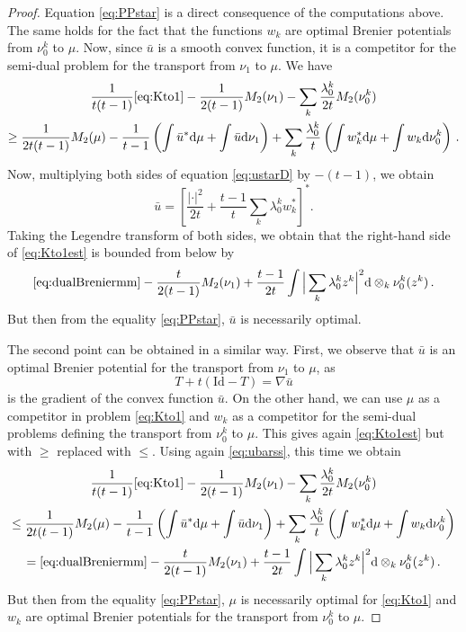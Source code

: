 \documentclass[12pt]{amsart}
\numberwithin{equation}{section}
\def\ed{\mathrm{d}}
\theoremstyle{plain}
\theoremstyle{definition}
\begin{document}
\begin{proof} Equation \eqref{eq:PPstar} is a direct consequence of the computations above. The same holds for the fact that the functions $w_k$ are optimal Brenier potentials from $\nu_0^k$ to $\mu$.
Now, since $\bar{u}$ is a smooth convex function, it is a competitor for the semi-dual problem for the transport from $\nu_1$ to $\mu$. We have
\begin{multline}\label{eq:Kto1est}
\frac{1}{t(t-1)}\eqref{eq:Kto1} - \frac{1}{2(t-1)} M_2(\nu_1) - \sum_k \frac{\lambda_0^k}{2t}M_2(\nu_0^k) \\\geq \frac{1}{2t(t-1)}  M_2(\mu) -\frac{1}{t-1}\left(\int \bar{u}^*\ed \mu + \int \bar{u} \ed \nu_1\right) + \sum_k \frac{\lambda_0^k}{t}\left( \int w_k^*\ed \mu + \int w_k \ed \nu_0^k \right)\,.
\end{multline}
Now, multiplying both sides of equation \eqref{eq:ustarD} by 
$-(t-1)$, we obtain
\begin{equation}\label{eq:ubarss}
\bar{u} = \left[ \frac{|\cdot|^2}{2t} + \frac{t-1}{t} \sum_k \lambda_0^k w^*_k  \right]^*.
\end{equation}
Taking the Legendre transform of both sides, we obtain that the right-hand side of \eqref{eq:Kto1est}  is bounded from below by
\[
\eqref{eq:dualBreniermm} - \frac{t}{2(t-1)}M_2(\nu_1) +\frac{t-1}{2t}   \int \Big|\sum_k  \lambda_0^k {z^k} \Big|^2 \ed \otimes_k\nu_0^k(z^k)\,.
\]
But then from the equality \eqref{eq:PPstar}, $\bar{u}$ is necessarily optimal.

The second point can be obtained in a similar way. First, we observe that $\bar{u}$ is an optimal Brenier potential for the transport from $\nu_1$ to $\mu$, as
\[
T + t(\mathrm{Id} -T) = \nabla \bar{u}
\]
is the gradient of the convex function $\bar{u}$. On the other hand, we can use $\mu$ as a competitor in problem \eqref{eq:Kto1}  and $w_k$ as a competitor for the semi-dual problems defining the transport from $\nu_0^k$ to $\mu$. This gives again \eqref{eq:Kto1est} but with $\geq$ replaced with $\leq$. Using again \eqref{eq:ubarss}, this time we obtain
\begin{multline}\label{eq:Kto1est2}
\frac{1}{t(t-1)}\eqref{eq:Kto1} - \frac{1}{2(t-1)} M_2(\nu_1) - \sum_k \frac{\lambda_0^k}{2t}M_2(\nu_0^k) \\\leq \frac{1}{2t(t-1)}  M_2(\mu) -\frac{1}{t-1}\left(\int \bar{u}^*\ed \mu + \int \bar{u} \ed \nu_1\right) + \sum_k \frac{\lambda_0^k}{t}\left( \int w_k^*\ed \mu + \int w_k \ed \nu_0^k \right) \\
= \eqref{eq:dualBreniermm} - \frac{t}{2(t-1)}M_2(\nu_1) +\frac{t-1}{2t}   \int \Big|\sum_k  \lambda_0^k {z^k} \Big|^2 \ed \otimes_k\nu_0^k(z^k)\,.
\end{multline}
But then from the equality \eqref{eq:PPstar}, $\mu$ is necessarily optimal for \eqref{eq:Kto1}  and $w_k$ are optimal Brenier potentials for the transport from $\nu^k_0$ to $\mu$.


\end{proof}
\end{document}
